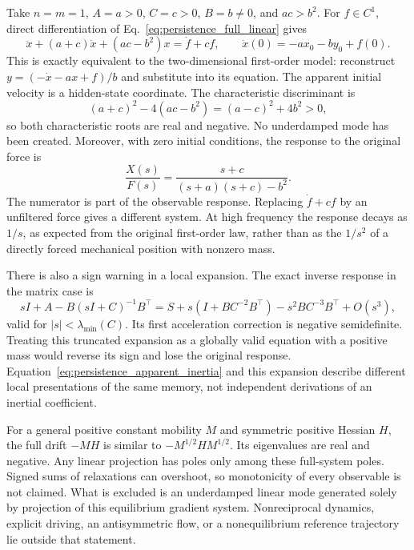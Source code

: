Take $n=m=1$, $A=a>0$, $C=c>0$, $B=b\ne0$, and $ac>b^2$. For $f\in C^1$, direct differentiation of Eq.~\eqref{eq:persistence_full_linear} gives
\begin{equation}
 \ddot x+(a+c)\dot x+(ac-b^2)x=\dot f+cf,
 \qquad \dot x(0)=-ax_0-by_0+f(0).
 \label{eq:persistence_apparent_inertia}
\end{equation}
This is exactly equivalent to the two-dimensional first-order model: reconstruct
$y=(-\dot x-ax+f)/b$ and substitute into its equation. The apparent initial velocity is a hidden-state coordinate. The characteristic discriminant is
\begin{equation}
 (a+c)^2-4(ac-b^2)=(a-c)^2+4b^2>0,
\end{equation}
so both characteristic roots are real and negative. No underdamped mode has been created. Moreover, with zero initial conditions, the response to the original force is
\begin{equation}
 \frac{X(s)}{F(s)}=
 \frac{s+c}{(s+a)(s+c)-b^2}.
 \label{eq:persistence_transfer}
\end{equation}
The numerator is part of the observable response. Replacing $\dot f+cf$ by an unfiltered force gives a different system. At high frequency the response decays as $1/s$, as expected from the original first-order law, rather than as the $1/s^2$ of a directly forced mechanical position with nonzero mass.

There is also a sign warning in a local expansion. The exact inverse response in the matrix case is
\begin{equation}
 sI+A-B(sI+C)^{-1}B^\top
 =S+s(I+BC^{-2}B^\top)-s^2BC^{-3}B^\top+O(s^3),
 \label{eq:persistence_low_frequency}
\end{equation}
valid for $|s|<\lambda_{\min}(C)$. Its first acceleration correction is negative semidefinite. Treating this truncated expansion as a globally valid equation with a positive mass would reverse its sign and lose the original response. Equation~\eqref{eq:persistence_apparent_inertia} and this expansion describe different local presentations of the same memory, not independent derivations of an inertial coefficient.

For a general positive constant mobility $M$ and symmetric positive Hessian $H$, the full drift $-MH$ is similar to $-M^{1/2}HM^{1/2}$. Its eigenvalues are real and negative. Any linear projection has poles only among these full-system poles. Signed sums of relaxations can overshoot, so monotonicity of every observable is not claimed. What is excluded is an underdamped linear mode generated solely by projection of this equilibrium gradient system. Nonreciprocal dynamics, explicit driving, an antisymmetric flow, or a nonequilibrium reference trajectory lie outside that statement.

